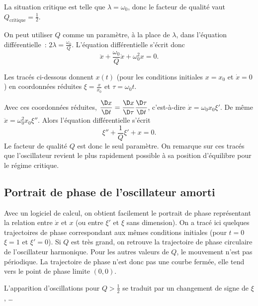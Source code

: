La situation critique est telle que $\lambda = \omega_0$, donc le facteur de qualité vaut $Q_{\text{critique}} = \frac{1}{2}$.

On peut utiliser $Q$ comme un paramètre, à la place de $\lambda$, dans l'équation différentielle~: $2\lambda = \frac{\omega_0}{Q}$. L'équation différentielle s'écrit donc
\begin{equation}
  \ddot x +\frac{\omega_0}{Q} \dot x +\omega_0^2 x = 0.
\end{equation}

Les tracés ci-dessous donnent $x(t)$ (pour les conditions initiales $x=x_0$ et $\dot x=0$) en coordonnées réduites $\xi=\frac{x}{x_0}$ et $\tau = \omega_0 t$.

Avec ces coordonnées réduites, $\derived{x}{t} = \derived{x}{\tau} \derived{\tau}{t}$, c'est-à-dire $\dot x = \omega_0 x_0 \xi'$. De même $\ddot x = \omega_0^2 x_0 \xi''$. Alors l'équation différentielle s'écrit
\begin{equation}
  \xi'' +\frac{1}{Q} \xi'+x=0.
\end{equation}
Le facteur de qualité $Q$ est donc le seul paramètre. On remarque sur ces tracés que l'oscillateur revient le plus rapidement possible à sa position d'équilibre pour le régime critique.

\subsection{Portrait de phase de l'oscillateur amorti}
\label{chap5-subsec:portraitdephasedeloscillateuramorti}

Avec un logiciel de calcul, on obtient facilement le portrait de phase représentant la relation entre $\dot x$ et $x$ (ou entre $\xi'$ et $\xi$ sans dimension). On a tracé ici quelques trajectoires de phase correspondant aux mêmes conditions initiales (pour $t=0$ $\xi=1$ et $\xi'=0$). Si $Q$ est très grand, on retrouve la trajectoire de phase circulaire de l'oscillateur harmonique. Pour les autres valeurs de $Q$, le mouvement n'est pas périodique. La trajectoire de phase n'est donc pas une courbe fermée, elle tend vers le point de phase limite $(0,0)$.

L'apparition d'oscillations pour $Q>\frac{1}{2}$ se traduit par un changement de signe de $\xi$, \ldots


